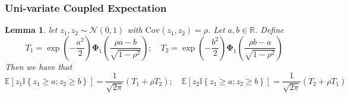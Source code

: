 \documentclass[10pt]{article} %
\newtheorem{lemma}[theorem]{Lemma}
\theoremstyle{definition}
\theoremstyle{plain}
\newcommand{\paren}[1]{\left(#1\right)}
\newcommand{\indy}[1]{\mathbb{I}\left\{#1\right\}}
\providecommand{\E}{\mathbb{E}}
\providecommand{\R}{\mathbb{R}}
\begin{document}
\subsubsection{Uni-variate Coupled Expectation}
\begin{lemma}
    \label{lem:first_ord_term_exp}
    let $z_1, z_2\sim\mathcal{N}\paren{0, 1}$ with $\text{Cov}\paren{z_1, z_2} = \rho$. Let $a, b \in\R$. Define
    \[
        T_1 = \exp\paren{-\frac{a^2}{2}}\bm{\Phi}_1\paren{\frac{\rho a - b}{\sqrt{1-\rho^2}}};\quad T_2 = \exp\paren{-\frac{b^2}{2}}\bm{\Phi}_1\paren{\frac{\rho b - a}{\sqrt{1-\rho^2}}}
    \]
    Then we have that
    \[
        \E\left[z_1\indy{z_1\geq a; z_2\geq b}\right] =\frac{1}{\sqrt{2\pi}}\paren{T_1 + \rho T_2};\quad \E\left[z_2\indy{z_1\geq a; z_2\geq b}\right] = \frac{1}{\sqrt{2\pi}}\paren{T_2 + \rho T_1}
    \]
\end{lemma}
\end{document}
